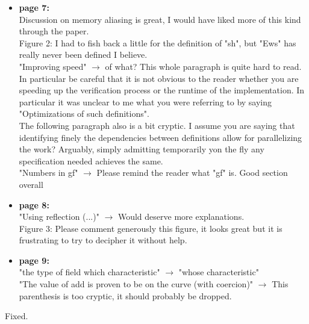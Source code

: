 \begin{itemize}
  \item \textbf{page 7:}\\
    Discussion on memory aliasing is great, I would have liked more of this kind through the paper.\\
    Figure 2: I had to fish back a little for the definition of "sh", but "Ews" has really never been defined I believe.\\
    "Improving speed" $\rightarrow$ of what? This whole paragraph is quite hard to read. In particular be careful that it is not obvious to the reader whether you are speeding up the verification process or the runtime of the implementation. In particular it was unclear to me what you were referring to by saying "Optimizations of such definitions".\\
    The following paragraph also is a bit cryptic. I assume you are saying that identifying finely the dependencies between definitions allow for parallelizing the work? Arguably, simply admitting temporarily yon the fly any specification needed  achieves the same.\\
    "Numbers in gf" $\rightarrow$ Please remind the reader what "gf" is. Good section overall
\end{itemize}
\begin{answer}
\end{answer}

\begin{itemize}
  \item \textbf{page 8:}\\
    "Using reflection (...)" $\rightarrow$ Would deserve more explanations.\\
    Figure 3: Please comment generously this figure, it looks great but it is frustrating to try to decipher it without help.
\end{itemize}
\begin{answer}
\end{answer}

\begin{itemize}
  \item \textbf{page 9:}\\
    "the type of field which characteristic" $\rightarrow$ "whose characteristic"\\
    "The value of add is proven to be on the curve (with coercion)" $\rightarrow$ This parenthesis is too cryptic, it should probably be dropped.
\end{itemize}
\begin{answer}
  Fixed.
\end{answer}

